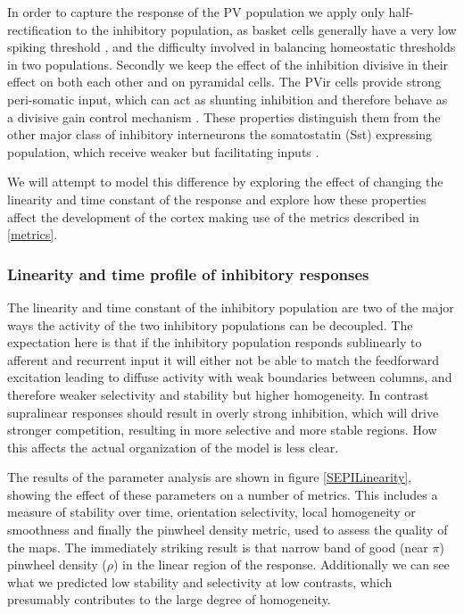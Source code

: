 In order to capture the response of the PV population we apply only
half-rectification to the inhibitory population, as basket cells
generally have a very low spiking threshold \citep{Ma2011}, and the
difficulty involved in balancing homeostatic thresholds in two
populations. Secondly we keep the effect of the inhibition divisive in
their effect on both each other and on pyramidal cells. The PVir cells
provide strong peri-somatic input, which can act as shunting
inhibition and therefore behave as a divisive gain control mechanism
\citep{Atallah2012, Wilson2012}. These properties distinguish them
from the other major class of inhibitory interneurons the somatostatin
(Sst) expressing population, which receive weaker but facilitating
inputs \citep{Beierlein2003,Bartley2008,Tan2008}.

We will attempt to model this difference by exploring the effect of
changing the linearity and time constant of the response and explore
how these properties affect the development of the cortex making use
of the metrics described in \ref{metrics}.

\subsubsection{Linearity and time profile of inhibitory responses}

The linearity and time constant of the inhibitory population are two
of the major ways the activity of the two inhibitory populations can
be decoupled. The expectation here is that if the inhibitory
population responds sublinearly to afferent and recurrent input it
will either not be able to match the feedforward excitation leading to
diffuse activity with weak boundaries between columns, and therefore
weaker selectivity and stability but higher homogeneity. In contrast
supralinear responses should result in overly strong inhibition, which
will drive stronger competition, resulting in more selective and more
stable regions. How this affects the actual organization of the model
is less clear.

The results of the parameter analysis are shown in figure
\ref{SEPILinearity}, showing the effect of these parameters on a
number of metrics. This includes a measure of stability over time,
orientation selectivity, local homogeneity or smoothness and finally
the pinwheel density metric, used to assess the quality of the
maps. The immediately striking result is that narrow band of good
(near $\pi$) pinwheel density ($\rho$) in the linear region of the
response. Additionally we can see what we predicted low stability and
selectivity at low contrasts, which presumably contributes to the
large degree of homogeneity.

